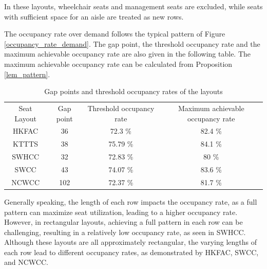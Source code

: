 In these layouts, wheelchair seats and management seats are excluded, while seats with sufficient space for an aisle are treated as new rows. 

The occupancy rate over demand follows the typical pattern of Figure \ref{occupancy_rate_demand}. The gap point, the threshold occupancy rate and the maximum achievable occupancy rate are also given in the following table. The maximum achievable occupancy rate can be calculated from Proposition \ref{lem_pattern}.

\begin{table}[ht]
  \centering
  \caption{Gap points and threshold occupancy rates of the layouts}
  \begin{tabular}{cccc}
  \hline
   Seat Layout & Gap point & Threshold occupancy rate & Maximum achievable occupancy rate \\
   \cmidrule(r){1-1} \cmidrule(lr){2-2} \cmidrule(lr){3-3} \cmidrule(l){4-4}
   HKFAC & 36 & 72.3 \% & 82.4 \% \\
   KTTTS & 38 & 75.79 \% & 84.1 \% \\
   SWHCC & 32 & 72.83 \% & 80 \% \\
   SWCC & 43 & 74.07 \%  & 83.6 \% \\
   NCWCC & 102 & 72.37 \% & 81.7 \% \\
   \hline
  \end{tabular}
\end{table}

Generally speaking, the length of each row impacts the occupancy rate, as a full pattern can maximize seat utilization, leading to a higher occupancy rate. However, in rectangular layouts, achieving a full pattern in each row can be challenging, resulting in a relatively low occupancy rate, as seen in SWHCC. Although these layouts are all approximately rectangular, the varying lengths of each row lead to different occupancy rates, as demonstrated by HKFAC, SWCC, and NCWCC.



